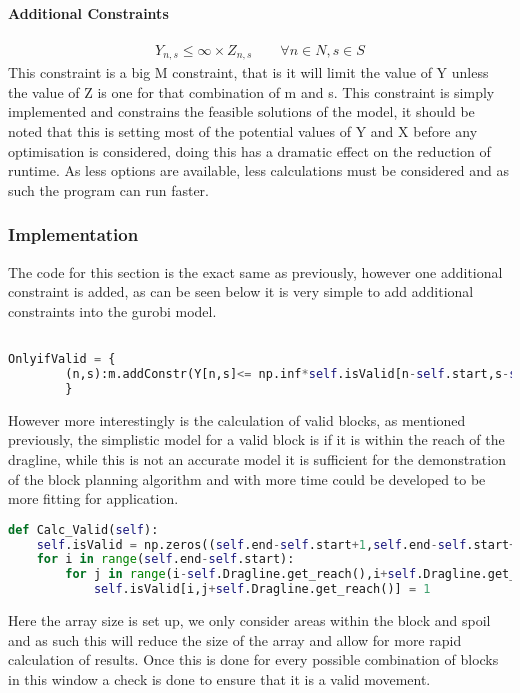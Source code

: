 \paragraph*{Additional Constraints}
\begin{align}
\label{MIP:Valid}
Y_{n,s}\leq \infty\times Z_{n,s} \qquad \forall n \in N , s\in S
\end{align}
This constraint is a big M constraint, that is it will limit the value of Y unless the value of Z is one for that combination of m and s. This constraint is simply implemented and constrains the feasible solutions of the model, it should be noted that this is setting most of the potential values of Y and X before any optimisation is considered, doing this has a dramatic effect on the reduction of runtime. As less options are available, less calculations must be considered and as such the program can run faster.
\subsubsection{Implementation}
The code for this section is the exact same as previously, however one additional constraint is added, as can be seen below it is very simple to add additional constraints into the gurobi model.
\begin{lstlisting}[language=python]

OnlyifValid = {
		(n,s):m.addConstr(Y[n,s]<= np.inf*self.isValid[n-self.start,s-self.start-self.Dragline.get_reach()]) for n in self.N for s in self.S
		}
\end{lstlisting}
However more interestingly is the calculation of valid blocks, as mentioned previously, the simplistic model for a valid block is if it is within the reach of the dragline, while this is not an accurate model it is sufficient for the demonstration of the block planning algorithm and with more time could be developed to be more fitting for application. 
\begin{lstlisting}[language = python]
def Calc_Valid(self):
	self.isValid = np.zeros((self.end-self.start+1,self.end-self.start+2*self.Dragline.get_reach()+1))
	for i in range(self.end-self.start):
		for j in range(i-self.Dragline.get_reach(),i+self.Dragline.get_reach()):
			self.isValid[i,j+self.Dragline.get_reach()] = 1
\end{lstlisting}
Here the array size is set up, we only consider areas within the block and spoil and as such this will reduce the size of the array and allow for more rapid calculation of results. Once this is done for every possible combination of blocks in this window a check is done to ensure that it is a valid movement. 
